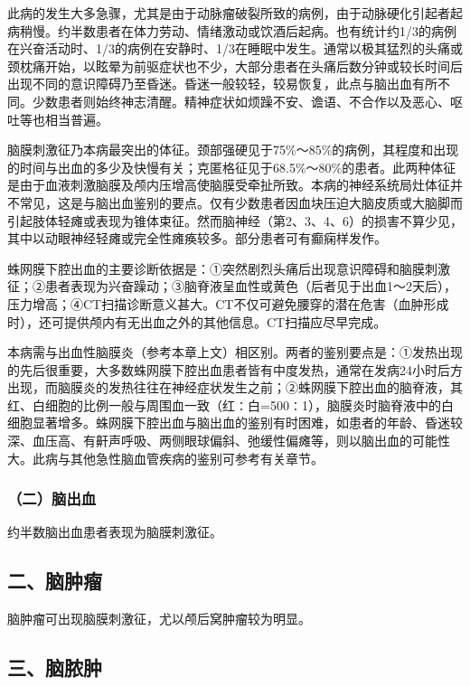此病的发生大多急骤，尤其是由于动脉瘤破裂所致的病例，由于动脉硬化引起者起病稍慢。约半数患者在体力劳动、情绪激动或饮酒后起病。也有统计约1/3的病例在兴奋活动时、1/3的病例在安静时、1/3在睡眠中发生。通常以极其猛烈的头痛或颈枕痛开始，以眩晕为前驱症状也不少，大部分患者在头痛后数分钟或较长时间后出现不同的意识障碍乃至昏迷。昏迷一般较轻，较易恢复，此点与脑出血有所不同。少数患者则始终神志清醒。精神症状如烦躁不安、谵语、不合作以及恶心、呕吐等也相当普遍。

脑膜刺激征乃本病最突出的体征。颈部强硬见于75\%～85\%的病例，其程度和出现的时间与出血的多少及快慢有关；克匿格征见于68.5\%～80\%的患者。此两种体征是由于血液刺激脑膜及颅内压增高使脑膜受牵扯所致。本病的神经系统局灶体征并不常见，这是与脑出血鉴别的要点。仅有少数患者因血块压迫大脑皮质或大脑脚而引起肢体轻瘫或表现为锥体束征。然而脑神经（第2、3、4、6）的损害不算少见，其中以动眼神经轻瘫或完全性瘫痪较多。部分患者可有癫痫样发作。

蛛网膜下腔出血的主要诊断依据是：①突然剧烈头痛后出现意识障碍和脑膜刺激征；②患者表现为兴奋躁动；③脑脊液呈血性或黄色（后者见于出血1～2天后），压力增高；④CT扫描诊断意义甚大。CT不仅可避免腰穿的潜在危害（血肿形成时），还可提供颅内有无出血之外的其他信息。CT扫描应尽早完成。

本病需与出血性脑膜炎（参考本章上文）相区别。两者的鉴别要点是：①发热出现的先后很重要，大多数蛛网膜下腔出血患者皆有中度发热，通常在发病24小时后方出现，而脑膜炎的发热往往在神经症状发生之前；②蛛网膜下腔出血的脑脊液，其红、白细胞的比例一般与周围血一致（红∶白=500∶1），脑膜炎时脑脊液中的白细胞显著增多。蛛网膜下腔出血与脑出血的鉴别有时困难，如患者的年龄、昏迷较深、血压高、有鼾声呼吸、两侧眼球偏斜、弛缓性偏瘫等，则以脑出血的可能性大。此病与其他急性脑血管疾病的鉴别可参考有关章节。

\subsubsection{（二）脑出血}

约半数脑出血患者表现为脑膜刺激征。

\subsection{二、脑肿瘤}

脑肿瘤可出现脑膜刺激征，尤以颅后窝肿瘤较为明显。

\subsection{三、脑脓肿}

